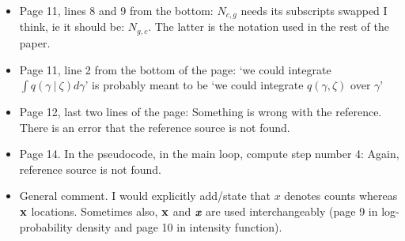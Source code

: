 \documentclass[12pt]{article}
\newcommand\givenbase[1][]{\:#1\lvert\:}
\let\given\givenbase
\begin{document}
\begin{itemize}
     \item Page 11,  lines 8 and 9 from the bottom: $N_{c,g}$ needs its subscripts swapped I think, ie it should be: $N_{g,c}$.  The latter is the notation used in the rest of the paper.

    \item Page 11, line 2 from the bottom of the page: `we could integrate $\int q(\gamma \given \zeta) d\gamma$' is probably meant to be `we could integrate $q(\gamma, \zeta)$ over $\gamma$'

    \item Page 12, last two lines of the page: Something is wrong with the reference. There is an error that the reference source is not found.

   \item Page 14. In the pseudocode, in the main loop, compute step number 4: Again, reference source is not found. 

   \item General comment. I would explicitly add/state that $x$ denotes counts whereas ${\bf x}$ locations. Sometimes also, ${\bf x}$ and  $\textit{\textbf{x}}$ are used interchangeably (page 9 in log-probability density and page 10 in intensity function).
\end{itemize}
\end{document}
